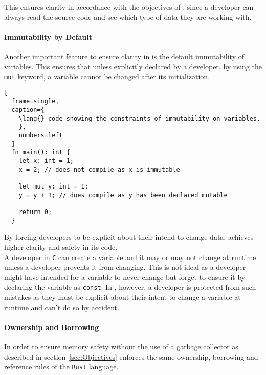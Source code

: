 This ensures clarity in accordance with the objectives of \lang{}, since a
developer can always read the source code and see which type of data they are working
with.

\paragraph{Immutability by Default} \hfill 
\vspace{0.1em}

Another important feature to ensure clarity in \lang{} is the default immutability of
variables. This ensures that unless explicitly declared by a developer, by using the
\texttt{mut} keyword, a variable
cannot be changed after its initialization.

\begin{lstlisting}[
  frame=single,
  caption={
    \lang{} code showing the constraints of immutability on variables.
    }, 
    numbers=left
  ]
  fn main(): int {
    let x: int = 1; 
    x = 2; // does not compile as x is immutable

    let mut y: int = 1; 
    y = y + 1; // does compile as y has been declared mutable

    return 0;
  }
\end{lstlisting}

By forcing developers to be explicit about their intend to change data, \lang{}
achieves higher clarity and safety in its code. \\ 

A developer in \texttt{C} can create a variable and it may or may not change at
runtime unless a developer prevents it from changing. This is not ideal as a
developer might have intended for a variable to never change but forget to ensure it
by declaring the variable as \texttt{const}. In \lang, however, a developer is protected from
such mistakes as they must be explicit about their intent to change a variable at
runtime and can't do so by accident.

\paragraph{Ownership and Borrowing} \hfill 
\label{par:Ownership}

In order to ensure memory safety without the use of a garbage collector as described
in section~\ref{sec:Objectives} \lang{} enforces the same ownership, borrowing and
reference rules of the \texttt{Rust} language\cite{RUST}.


